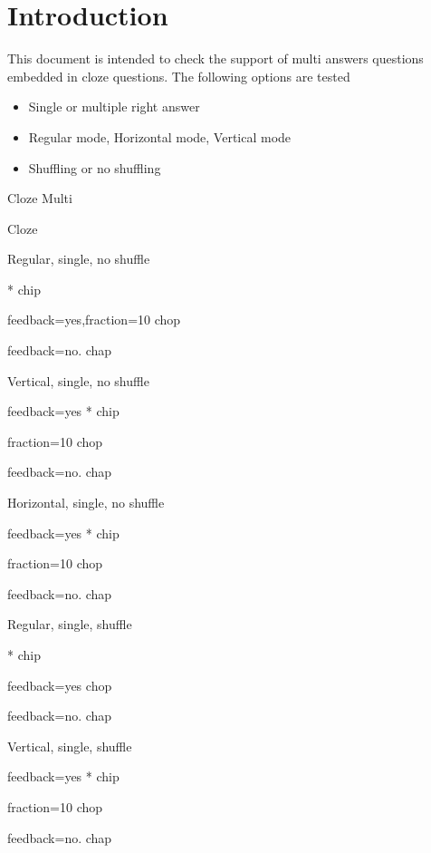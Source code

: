 \documentclass{article}
\begin{document}
\section*{Introduction}

This document is intended to check the support of multi answers questions 
embedded in cloze questions. The following options are tested
\begin{itemize}
	\item Single or multiple right answer
	\item Regular mode, Horizontal mode, Vertical mode
	\item Shuffling or no shuffling
\end{itemize}

\begin{quiz}{Cloze Multi}

\begin{cloze}{Cloze}
\begin{multi}[shuffle=false]
Regular, single, no shuffle
\item[]* chip
\item[feedback={yes},fraction=10] chop
\item[feedback={no.}] chap
\end{multi}

\begin{multi}[shuffle=false,vertical]
Vertical, single, no shuffle
\item[feedback={yes}]* chip
\item[fraction=10] chop
\item[feedback={no.}] chap
\end{multi}

\begin{multi}[shuffle=false,horizontal]
Horizontal, single, no shuffle
\item[feedback={yes}]* chip
\item[fraction=10] chop
\item[feedback={no.}] chap
\end{multi}

\begin{multi}[shuffle=true]
	Regular, single, shuffle
	\item[]* chip
	\item[feedback={yes}] chop
	\item[feedback={no.}] chap
\end{multi}

\begin{multi}[shuffle=true,vertical]
	Vertical, single, shuffle
	\item[feedback={yes}]* chip
	\item[fraction=10] chop
	\item[feedback={no.}] chap
\end{multi}


\end{cloze}
\end{quiz}
\end{document}
